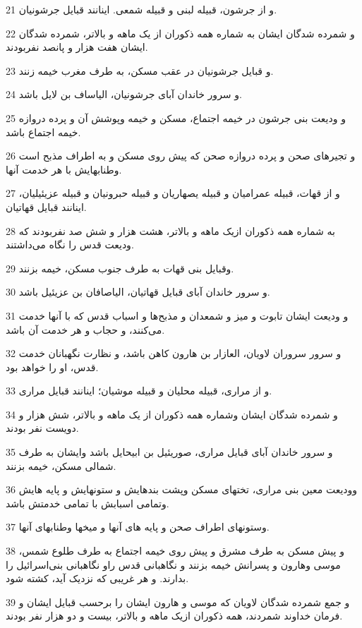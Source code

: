 \par 21 و از جرشون، قبیله لبنی و قبیله شمعی. اینانند قبایل جرشونیان.
\par 22 و شمرده شدگان ایشان به شماره همه ذکوران از یک ماهه و بالاتر، شمرده شدگان ایشان هفت هزار و پانصد نفربودند.
\par 23 و قبایل جرشونیان در عقب مسکن، به طرف مغرب خیمه زنند.
\par 24 و سرور خاندان آبای جرشونیان، الیاساف بن لایل باشد.
\par 25 و ودیعت بنی جرشون در خیمه اجتماع، مسکن و خیمه وپوشش آن و پرده دروازه خیمه اجتماع باشد.
\par 26 و تجیرهای صحن و پرده دروازه صحن که پیش روی مسکن و به اطراف مذبح است وطنابهایش با هر خدمت آنها.
\par 27 و از قهات، قبیله عمرامیان و قبیله یصهاریان و قبیله حبرونیان و قبیله عزیئیلیان، اینانند قبایل قهاتیان.
\par 28 به شماره همه ذکوران ازیک ماهه و بالاتر، هشت هزار و شش صد نفربودند که ودیعت قدس را نگاه می‌داشتند.
\par 29 وقبایل بنی قهات به طرف جنوب مسکن، خیمه بزنند.
\par 30 و سرور خاندان آبای قبایل قهاتیان، الیاصافان بن عزیئیل باشد.
\par 31 و ودیعت ایشان تابوت و میز و شمعدان و مذبح‌ها و اسباب قدس که با آنها خدمت می‌کنند، و حجاب و هر خدمت آن باشد.
\par 32 و سرور سروران لاویان، العازار بن هارون کاهن باشد، و نظارت نگهبانان خدمت قدس، او را خواهد بود.
\par 33 و از مراری، قبیله محلیان و قبیله موشیان؛ اینانند قبایل مراری.
\par 34 و شمرده شدگان ایشان وشماره همه ذکوران از یک ماهه و بالاتر، شش هزار و دویست نفر بودند.
\par 35 و سرور خاندان آبای قبایل مراری، صوریئیل بن ابیحایل باشد وایشان به طرف شمالی مسکن، خیمه بزنند.
\par 36 وودیعت معین بنی مراری، تختهای مسکن وپشت بندهایش و ستونهایش و پایه هایش وتمامی اسبابش با تمامی خدمتش باشد.
\par 37 وستونهای اطراف صحن و پایه های آنها و میخها وطنابهای آنها.
\par 38 و پیش مسکن به طرف مشرق و پیش روی خیمه اجتماع به طرف طلوع شمس، موسی وهارون و پسرانش خیمه بزنند و نگاهبانی قدس راو نگاهبانی بنی‌اسرائیل را بدارند. و هر غریبی که نزدیک آید، کشته شود.
\par 39 و جمع شمرده شدگان لاویان که موسی و هارون ایشان را برحسب قبایل ایشان و فرمان خداوند شمردند، همه ذکوران ازیک ماهه و بالاتر، بیست و دو هزار نفر بودند.
